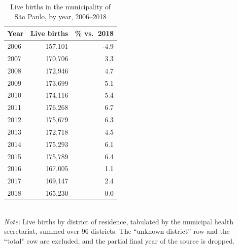 \begin{table}[htbp]\centering
\caption{Live births in the municipality of S\~ao Paulo, by year, 2006--2018}
\label{tab:S6a_nascidos_municipio}
\small
\begin{tabular}{lrr}
\toprule
Year & Live births & \% vs.\ 2018 \\
\midrule
2006 & 157,101 & -4.9 \\
2007 & 170,706 & 3.3 \\
2008 & 172,946 & 4.7 \\
2009 & 173,699 & 5.1 \\
2010 & 174,116 & 5.4 \\
2011 & 176,268 & 6.7 \\
2012 & 175,679 & 6.3 \\
2013 & 172,718 & 4.5 \\
2014 & 175,293 & 6.1 \\
2015 & 175,789 & 6.4 \\
2016 & 167,005 & 1.1 \\
2017 & 169,147 & 2.4 \\
2018 & 165,230 & 0.0 \\
\bottomrule
\end{tabular}
\\[3pt]{\footnotesize \textit{Note:} Live births by district of residence, tabulated by the municipal health secretariat, summed over 96 districts. The ``unknown district'' row and the ``total'' row are excluded, and the partial final year of the source is dropped.}
\end{table}
